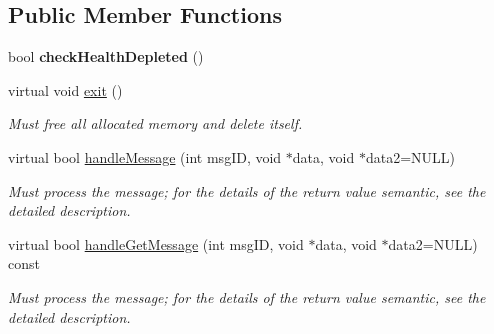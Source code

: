 \subsection*{\-Public \-Member \-Functions}
\begin{DoxyCompactItemize}
\item 
\hypertarget{classComponentHealth_acfba9c633c4a9c28d44f6d0a02c2d808}{
bool {\bfseries check\-Health\-Depleted} ()}
\label{dc/d15/classComponentHealth_acfba9c633c4a9c28d44f6d0a02c2d808}

\item 
\hypertarget{classComponentHealth_a13d546d8db12ffb620fd975231a579f5}{
virtual void \hyperlink{classComponentHealth_a13d546d8db12ffb620fd975231a579f5}{exit} ()}
\label{dc/d15/classComponentHealth_a13d546d8db12ffb620fd975231a579f5}

\begin{DoxyCompactList}\small\item\em \-Must free all allocated memory and delete itself. \end{DoxyCompactList}\item 
virtual bool \hyperlink{classComponentHealth_ad444abae855c20c8acc484437c76ec82}{handle\-Message} (int msg\-I\-D, void $\ast$data, void $\ast$data2=\-N\-U\-L\-L)
\begin{DoxyCompactList}\small\item\em \-Must process the message; for the details of the return value semantic, see the detailed description. \end{DoxyCompactList}\item 
virtual bool \hyperlink{classComponentHealth_aedc8600f4ab85c67af5dd47a94a018b1}{handle\-Get\-Message} (int msg\-I\-D, void $\ast$data, void $\ast$data2=\-N\-U\-L\-L) const 
\begin{DoxyCompactList}\small\item\em \-Must process the message; for the details of the return value semantic, see the detailed description. \end{DoxyCompactList}\end{DoxyCompactItemize}

